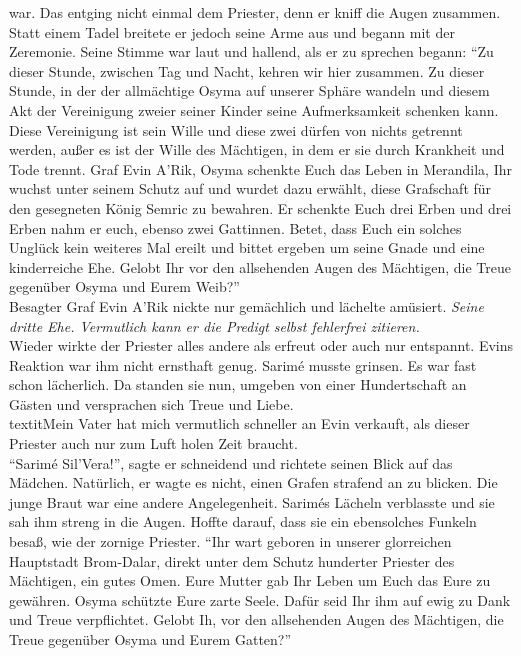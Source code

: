 war. Das entging nicht einmal dem Priester, denn er kniff die Augen zusammen. Statt einem Tadel 
breitete er jedoch seine Arme aus und begann mit der Zeremonie. Seine Stimme war laut und hallend, 
als er zu sprechen begann: ``Zu dieser Stunde, zwischen Tag und Nacht, kehren wir hier zusammen. Zu 
dieser Stunde, in der der allmächtige Osyma auf unserer Sphäre wandeln und diesem Akt der 
Vereinigung zweier seiner Kinder seine Aufmerksamkeit schenken kann. Diese Vereinigung ist sein 
Wille und diese zwei dürfen von nichts getrennt werden, außer es ist der Wille des Mächtigen, in 
dem er sie durch Krankheit und Tode trennt. Graf Evin A’Rik, Osyma schenkte Euch das Leben in 
Merandila, Ihr wuchst unter seinem Schutz auf und wurdet dazu erwählt, diese Grafschaft für den 
gesegneten König Semric zu bewahren. Er schenkte Euch drei Erben und drei Erben nahm er euch, 
ebenso zwei Gattinnen. Betet, dass Euch ein solches Unglück kein weiteres Mal ereilt und bittet 
ergeben um seine Gnade und eine kinderreiche Ehe. Gelobt Ihr vor den allsehenden Augen des 
Mächtigen, die Treue gegenüber Osyma und Eurem Weib?''\\
Besagter Graf Evin A'Rik nickte nur gemächlich und lächelte amüsiert. \textit{Seine dritte Ehe. 
Vermutlich kann er die Predigt selbst fehlerfrei zitieren.}\\
Wieder wirkte der Priester alles andere als erfreut oder auch nur entspannt. Evins Reaktion war ihm 
nicht ernsthaft genug. Sarimé musste grinsen. Es war fast schon lächerlich. Da standen sie nun, 
umgeben von einer Hundertschaft an Gästen und versprachen sich Treue und Liebe.
\\textit{Mein Vater hat mich vermutlich schneller an Evin verkauft, als dieser Priester auch nur 
zum Luft holen Zeit braucht.}\\
``Sarimé Sil'Vera!'', sagte er schneidend und richtete seinen Blick auf das Mädchen.
Natürlich, er wagte es nicht, einen Grafen strafend an zu blicken. Die junge Braut war eine andere 
Angelegenheit. Sarimés Lächeln verblasste und sie sah ihm streng in die Augen. Hoffte darauf, dass 
sie ein ebensolches Funkeln besaß, wie der zornige Priester.
``Ihr wart geboren in unserer glorreichen Hauptstadt Brom-Dalar, direkt unter dem Schutz hunderter 
Priester des Mächtigen, ein gutes Omen. Eure Mutter gab Ihr Leben um Euch das Eure zu gewähren. 
Osyma schützte Eure zarte Seele. Dafür seid Ihr ihm auf ewig zu Dank und Treue verpflichtet. Gelobt 
Ih, vor den allsehenden Augen des Mächtigen, die Treue gegenüber Osyma und Eurem Gatten?''\\
